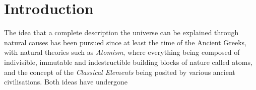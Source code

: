 \chapter{Introduction}\label{chapter:intro}
The idea that a complete description the universe can be explained through natural causes has been pursued since at least the time of the Ancient Greeks, with natural theories such as \emph{Atomism}, where everything being composed of indivisible, immutable and indestructible building blocks of nature called atoms, and the concept of the \emph{Classical Elements} being posited by various ancient civilisations.
Both ideas have undergone 
